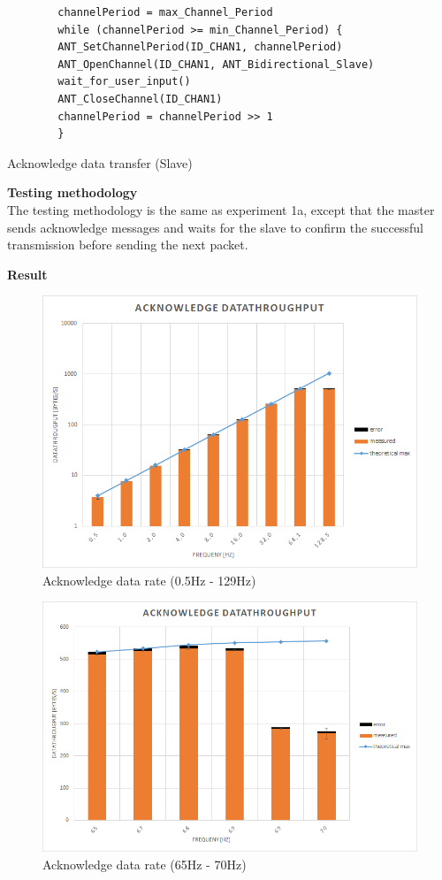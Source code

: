 \begin{description}
	\begin{code}[h]
		\begin{verbatim}
		channelPeriod = max_Channel_Period
		while (channelPeriod >= min_Channel_Period) {
		ANT_SetChannelPeriod(ID_CHAN1, channelPeriod)
		ANT_OpenChannel(ID_CHAN1, ANT_Bidirectional_Slave)
		wait_for_user_input()
		ANT_CloseChannel(ID_CHAN1)
		channelPeriod = channelPeriod >> 1
		}
		\end{verbatim}
		\caption{Acknowledge data transfer (Slave)}\label{lst:sExp4}
	\end{code}
	\item{\textbf{Testing methodology}} \hfill \\ The testing methodology is the same as experiment 1a, except that the master sends acknowledge messages and waits for the slave to confirm the successful transmission before sending the next packet. 
	\item{\textbf{Result}} \hfill \\
	\begin{figure}[h]
		\centering
		\includegraphics[scale=0.5]{content/images/exp4_norm.png}
		\caption{Acknowledge data rate (0.5Hz - 129Hz)}\label{fig:exp4norm}
	\end{figure}
	\begin{figure}[h]
		\centering
		\includegraphics[scale=0.5]{content/images/exp4_detail.png}
		\caption{Acknowledge data rate (65Hz - 70Hz)}\label{fig:exp4between}
	\end{figure}
	

\end{description}
